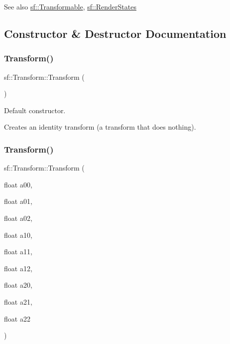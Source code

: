 \begin{DoxySeeAlso}{See also}
\mbox{\hyperlink{classsf_1_1_transformable}{sf\+::\+Transformable}}, \mbox{\hyperlink{classsf_1_1_render_states}{sf\+::\+Render\+States}} \begin{DoxyVerb}\end{DoxyVerb}
 
\end{DoxySeeAlso}


\subsection{Constructor \& Destructor Documentation}
\mbox{\label{classsf_1_1_transform_ac32de51bd0b9f3d52fbe0838225ee83b}} 
\subsubsection{\texorpdfstring{Transform()}{Transform()}\hspace{0.1cm}{\footnotesize\ttfamily [1/2]}}
{\footnotesize\ttfamily sf\+::\+Transform\+::\+Transform (\begin{DoxyParamCaption}{ }\end{DoxyParamCaption})}



Default constructor. 

Creates an identity transform (a transform that does nothing). \begin{DoxyVerb}\end{DoxyVerb}
 \mbox{\label{classsf_1_1_transform_a78c48677712fcf41122d02f1301d71a3}} 
\subsubsection{\texorpdfstring{Transform()}{Transform()}\hspace{0.1cm}{\footnotesize\ttfamily [2/2]}}
{\footnotesize\ttfamily sf\+::\+Transform\+::\+Transform (\begin{DoxyParamCaption}\item[{float}]{a00,  }\item[{float}]{a01,  }\item[{float}]{a02,  }\item[{float}]{a10,  }\item[{float}]{a11,  }\item[{float}]{a12,  }\item[{float}]{a20,  }\item[{float}]{a21,  }\item[{float}]{a22 }\end{DoxyParamCaption})}



